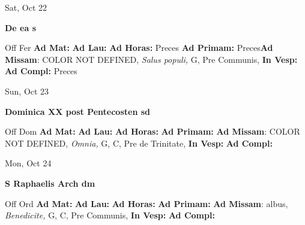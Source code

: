 \documentclass[10pt]{memoir}
\begin{document}
\begin{center}
\begin{minipage}{3.5in}
\vspace{2em}
\begin{center}Sat, Oct 22
\end{center}
\textbf{ \large De ea
\textnormal{\normalsize s}}

\begin{justify}Off Fer
\textbf{Ad Mat: }
\textbf{Ad Lau: }
\textbf{Ad Horas: }Preces
\textbf{Ad Primam: }Preces\textbf{Ad Missam}: COLOR NOT DEFINED, \textit{Salus populi,} G, Pre Communis, 
\textbf{In Vesp: }
\textbf{Ad Compl: }Preces
\end{justify}
\end{minipage}
\end{center}

\begin{center}
\begin{minipage}{3.5in}
\vspace{2em}
\begin{center}Sun, Oct 23
\end{center}
\textbf{ \large Dominica XX post Pentecosten
\textnormal{\normalsize sd}}

\begin{justify}Off Dom
\textbf{Ad Mat: }
\textbf{Ad Lau: }
\textbf{Ad Horas: }
\textbf{Ad Primam: }\textbf{Ad Missam}: COLOR NOT DEFINED, \textit{Omnia,} G, C, Pre de Trinitate, 
\textbf{In Vesp: }
\textbf{Ad Compl: }
\end{justify}
\end{minipage}
\end{center}

\begin{center}
\begin{minipage}{3.5in}
\vspace{2em}
\begin{center}Mon, Oct 24
\end{center}
\textbf{ \large S Raphaelis Arch
\textnormal{\normalsize dm}}

\begin{justify}Off Ord
\textbf{Ad Mat: }
\textbf{Ad Lau: }
\textbf{Ad Horas: }
\textbf{Ad Primam: }\textbf{Ad Missam}: albus, \textit{Benedicite,} G, C, Pre Communis, 
\textbf{In Vesp: }
\textbf{Ad Compl: }
\end{justify}
\end{minipage}
\end{center}
\end{document}
